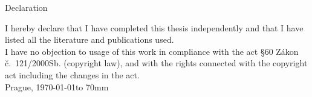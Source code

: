 \cleardoublepage
\vspace*{\fill}
\noindent
{\huge {%
Declaration%
}}
\vspace{3ex}\par
\noindent
\noindent
I hereby declare that I have completed this thesis independently and that I have listed all the literature and publications used.\\
I have no objection to usage of this work in compliance with the act \S 60 Zákon č.~121/2000Sb. (copyright law), and with the rights connected with the copyright act including the changes in the act.%
\\[15mm]
Prague, \today \hfill \hbox to 70mm{\tiny\dotfill}
